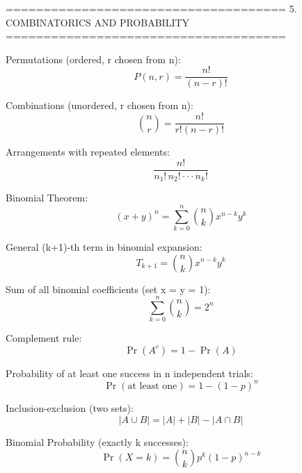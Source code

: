 =====================================
5. COMBINATORICS AND PROBABILITY
=====================================

Permutations (ordered, r chosen from n):
$$P(n,r) = \frac{n!}{(n-r)!}$$

Combinations (unordered, r chosen from n):
$$\binom{n}{r} = \frac{n!}{r!(n-r)!}$$

Arrangements with repeated elements:
$$\frac{n!}{n_1! \, n_2! \cdot \cdot \cdot n_k!}$$

Binomial Theorem:
$$(x + y)^n = \sum_{k=0}^n \binom{n}{k} x^{n-k} y^k$$

General (k+1)-th term in binomial expansion:
$$T_{k+1} = \binom{n}{k} x^{n-k} y^k$$

Sum of all binomial coefficients (set x = y = 1):
$$\sum_{k=0}^n \binom{n}{k} = 2^n$$

Complement rule:
$$\Pr(A^c) = 1 - \Pr(A)$$

Probability of at least one success in n independent trials:
$$\Pr(\text{at least one}) = 1 - (1 - p)^n$$

Inclusion-exclusion (two sets):
$$\left| A \cup B \right| = \left| A \right| + \left| B \right| - \left| A \cap B \right|$$

Binomial Probability (exactly k successes):
$$\Pr(X = k) = \binom{n}{k} p^k (1-p)^{n-k}$$
